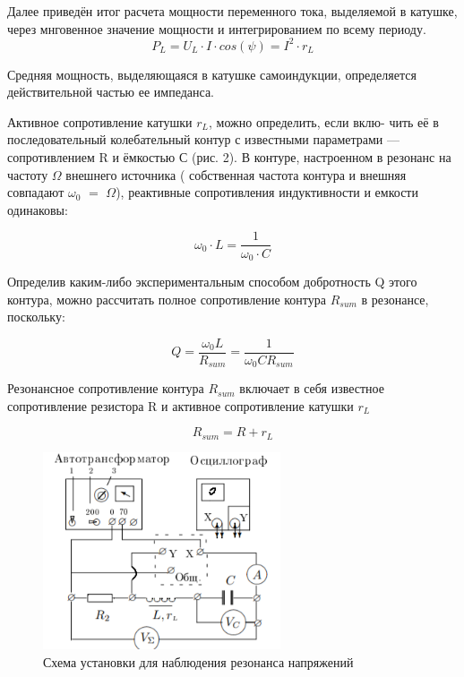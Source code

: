 \documentclass[a4paper, 14pt]{extarticle}%
\begin{document}
Далее приведён итог расчета мощности переменного тока, выделяемой в катушке, через мнговенное значение мощности и интегрированием по всему периоду. 
\begin{equation}\label{}
P_L = U_L\cdot I\cdot cos(\psi) = I^2\cdot r_L
\end{equation}

Средняя мощность, выделяющаяся в катушке самоиндукции, определяется действительной частью ее импеданса.

Активное сопротивление катушки $r_L$, можно определить, если вклю-
чить её в последовательный колебательный контур с известными параметрами — сопротивлением R и ёмкостью С (рис. 2). В контуре, настроенном в резонанс на частоту $\Omega$ внешнего источника ( собственная частота контура и внешняя совпадают $\omega_0$ $=$ $\Omega$), реактивные сопротивления индуктивности и емкости одинаковы:

\begin{equation}\label{}
\omega_0 \cdot L = \frac{1}{\omega_0\cdot C}
\end{equation}

Определив каким-либо экспериментальным способом добротность Q этого контура, можно рассчитать полное сопротивление контура $R_{sum}$ в резонансе, поскольку:

\begin{equation}\label{}
Q = \frac{\omega_0 L}{R_{sum}} = \frac{1}{\omega_0 C R_{sum}}
\end{equation}

Резонансное сопротивление контура $R_{sum}$ включает в себя известное сопротивление резистора R и активное сопротивление катушки $r_L$

\begin{equation}\label{}
R_{sum} = R + r_L
\end{equation}

\begin{figure}[h]
	\includegraphics[width= 7cm]{pics/Pic2.png}
	\caption{Схема установки для наблюдения резонанса напряжений}
	\label{Pic2}
\end{figure}
\end{document}

